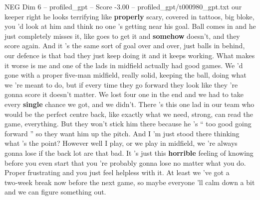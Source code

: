 \begin{textsample}{NEG Dim 6 – profiled\_gpt – Score -3.00 – profiled\_gpt/t000980\_gpt.txt}  \label{ex:f6_neg_010}
our keeper right he looks terrifying like \textbf{properly} scary, covered in tattoos, big bloke, you ’d look at him and think no one ’s getting near his goal.
Ball comes in and he just completely misses it, like goes to get it and \textbf{somehow} doesn't, and they score again.
And it ’s the same sort of goal over and over, just balls in behind, our defence is that bad they just keep doing it and it keeps working.
What makes it worse is me and one of the lads in midfield actually had good games.
We ’d gone with a proper five‑man midfield, really solid, keeping the ball, doing what we ’re meant to do, but if every time they go forward they look like they ’re gonna score it doesn't matter.
We lost four one in the end and we had to take every \textbf{single} chance we got, and we didn't.
There ’s this one lad in our team who would be the perfect centre back, like exactly what we need, strong, can read the game, everything.
But they won't stick him there because he ’s “ too good going forward ” so they want him up the pitch.
And I ’m just stood there thinking what ’s the point?
However well I play, or we play in midfield, we ’re always gonna lose if the back lot are that bad.
It ’s just this \textbf{horrible} feeling of knowing before you even start that you ’re probably gonna lose no matter what you do.
Proper frustrating and you just feel helpless with it.
At least we ’ve got a two‑week break now before the next game, so maybe everyone ’ll calm down a bit and we can figure something out.

\end{textsample}
